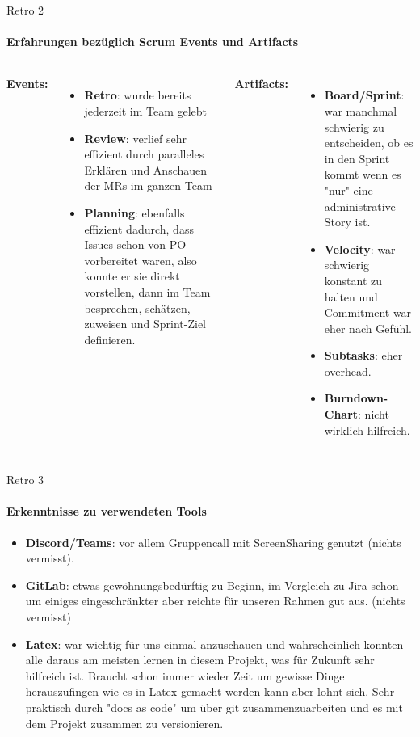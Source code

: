 \documentclass[
    ngerman,%
    authorontitle=true,
]{bfhbeamer}
\begin{document}
    \begin{frame}{Retro 2}
        \framesubtitle{Erfahrungen bezüglich Scrum Events und Artifacts}
        \begin{columns}
            \textbf{Events:}
            \begin{itemize}
                \item \textbf{Retro}: wurde bereits jederzeit im Team gelebt
                \item \textbf{Review}: verlief sehr effizient durch paralleles Erklären und Anschauen der MRs im ganzen Team
                \item \textbf{Planning}: ebenfalls effizient dadurch, dass Issues schon von PO vorbereitet waren,
                also konnte er sie direkt vorstellen, dann im Team besprechen, schätzen, zuweisen und Sprint-Ziel definieren.
            \end{itemize}

            \textbf{Artifacts:}
            \begin{itemize}
                \item \textbf{Board/Sprint}: war manchmal schwierig zu entscheiden, ob es in den Sprint kommt wenn es "nur" eine administrative Story ist.
                \item \textbf{Velocity}: war schwierig konstant zu halten und Commitment war eher nach Gefühl.
                \item \textbf{Subtasks}: eher overhead.
                \item \textbf{Burndown-Chart}: nicht wirklich hilfreich.
            \end{itemize}
        \end{columns}
    \end{frame}

    \begin{frame}{Retro 3}
        \framesubtitle{Erkenntnisse zu verwendeten Tools}
        \begin{itemize}
            \item \textbf{Discord/Teams}: vor allem Gruppencall mit ScreenSharing genutzt (nichts vermisst).
            \item \textbf{GitLab}: etwas gewöhnungsbedürftig zu Beginn, im Vergleich zu Jira schon um einiges eingeschränkter aber reichte für unseren Rahmen gut aus.
            (nichts vermisst)
            \item \textbf{Latex}: war wichtig für uns einmal anzuschauen und wahrscheinlich konnten alle daraus am meisten lernen in diesem Projekt, was für Zukunft sehr hilfreich ist.
            Braucht schon immer wieder Zeit um gewisse Dinge herauszufingen wie es in Latex gemacht werden kann aber lohnt sich.
            Sehr praktisch durch "docs as code" um über git zusammenzuarbeiten und es mit dem Projekt zusammen zu versionieren.
        \end{itemize}
    \end{frame}
\end{document}
